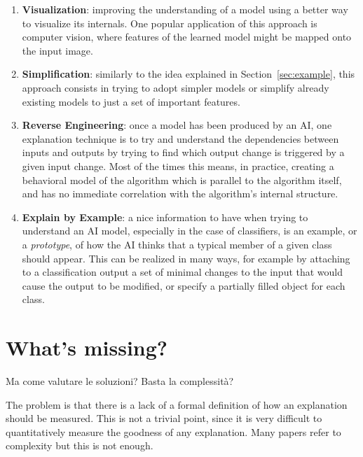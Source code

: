 \documentclass[conference]{IEEEtran}
\newcommand{\cit}{\todo[tickmarkheight=0.2cm]{cit}}
\begin{document}
\begin{enumerate}
    \item \textbf{Visualization}: improving the understanding of a model using a better way to visualize its internals. One popular application of this approach is computer vision, where features of the learned model might be mapped onto the input image. \cit
    \item \textbf{Simplification}: similarly to the idea explained in Section~\ref{sec:example}, this approach consists in trying to adopt simpler models or simplify already existing models to just a set of important features. \cit
    \item \textbf{Reverse Engineering}: once a model has been produced by an AI, one explanation technique is to try and understand the dependencies between inputs and outputs by trying to find which output change is triggered by a given input change. Most of the times this means, in practice, creating a behavioral model of the algorithm which is parallel to the algorithm itself, and has no immediate correlation with the algorithm's internal structure.
    \item \textbf{Explain by Example}: a nice information to have when trying to understand an AI model, especially in the case of classifiers, is an example, or a \textit{prototype}, of how the AI thinks that a typical member of a given class should appear. This can be realized in many ways, for example by attaching to a classification output a set of minimal changes to the input that would cause the output to be modified, or specify a partially filled object for each class.
\end{enumerate}


\section{What's missing?}
\label{sec:notconsidered}




Ma come valutare le soluzioni? Basta la complessità?

The problem is that there is a lack of a formal definition of how an explanation
should be measured. This is not a trivial point, since it is very difficult to
quantitatively measure the goodness of any explanation. Many papers refer to
complexity but this is not enough.
\end{document}
